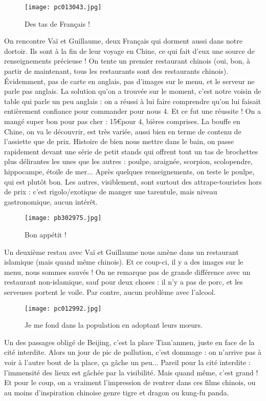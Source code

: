 \documentclass{book}
\begin{document}
\begin{wrapfigure}{l}{0.5\textwidth}
\centering
\texttt{[image: pc013043.jpg]}
\caption*{ Des tas de Français !}
\end{wrapfigure}

On rencontre Vaï et Guillaume, deux Français qui dorment aussi dans notre dortoir. Ils sont à la fin de leur voyage en Chine, ce qui fait d'eux une source de renseignements précieuse ! On tente un premier restaurant chinois (oui, bon, à partir de maintenant, tous les restaurants sont des restaurants chinois). Évidemment, pas de carte en anglais, pas d'images sur le menu, et le serveur ne parle pas anglais. La solution qu'on a trouvée sur le moment, c'est notre voisin de table qui parle un peu anglais : on a réussi à lui faire comprendre qu'on lui faisait entièrement confiance pour commander pour nous 4. Et ce fut une réussite ! On a mangé super bon pour pas cher : 15\euro pour 4, bières comprises. La bouffe en Chine, on va le découvrir, est très variée, aussi bien en terme de contenu de l'assiette que de prix. Histoire de bien nous mettre dans le bain, on passe rapidement devant une série de petit stands qui offrent tout un tas de brochettes plus délirantes les unes que les autres : poulpe, araignée, scorpion, scolopendre, hippocampe, étoile de mer... Après quelques renseignements, on teste le poulpe, qui est plutôt bon. Les autres, visiblement, sont surtout des attrape-touristes hors de prix : c'est rigolo/exotique de manger une tarentule, mais niveau gastronomique, aucun intérêt.


\begin{figure}[H]
\centering
\texttt{[image: pb302975.jpg]}
\caption*{ Bon appétit !}
\end{figure}

Un deuxième restau avec Vaï et Guillaume nous amène dans un restaurant islamique (mais quand même chinois). Et ce coup-ci, il y a des images sur le menu, nous sommes sauvés ! On ne remarque pas de grande différence avec un restaurant non-islamique, sauf pour deux choses : il n'y a pas de porc, et les serveuses portent le voile. Par contre, aucun problème avec l'alcool.


\begin{figure}[H]
\centering
\texttt{[image: pc012992.jpg]}
\caption*{ Je me fond dans la population en adoptant leurs mœurs.}
\end{figure}

Un des passages obligé de Beijing, c'est la place Tian'anmen, juste en face de la cité interdite. Alors un jour de pic de pollution, c'est dommage : on n'arrive pas à voir à l'autre bout de la place, ça gâche un peu... Pareil pour la cité interdite : l'immensité des lieux est gâchée par la visibilité. Mais quand même, c'est grand ! Et pour le coup, on a vraiment l'impression de rentrer dans ces films chinois, ou au moins d'inspiration chinoise genre tigre et dragon ou kung-fu panda.
\end{document}
